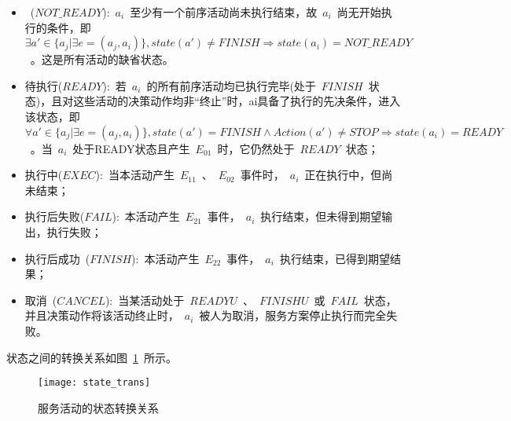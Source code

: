 \begin{itemize}
    
    \item ~($NOT\_READY$):~$a_i$~至少有一个前序活动尚未执行结束，故~$a_i$~尚无开始执行的条件，即~$\exists a' \in \{ {a_j}|\exists e = ( {{a_j},{a_i}} )\} ,state ( {a'} ) \ne FINISH \Rightarrow state ( {{a_i}} ) = NOT\_READY$~。这是所有活动的缺省状态。
    
    \item 待执行($READY$):~若~$a_i$~的所有前序活动均已执行完毕(处于~$FINISH$~状态)，且对这些活动的决策动作均非“终止”时，ai具备了执行的先决条件，进入该状态，即~$\forall a' \in \{ {a_j}|\exists e = ( {{a_j},{a_i}} )\} ,state ( {a'} ) = FINISH \wedge Action(a') \ne STOP \Rightarrow state ( {{a_i}} ) = READY$~。当~$a_i$~处于READY状态且产生~$E_{01}$~时，它仍然处于~$READY$~状态；
    
    \item 执行中($EXEC$):~当本活动产生~$E_{11}$~、~$E_{02}$~事件时，~$a_i$~正在执行中，但尚未结束；
    
    \item 执行后失败($FAIL$):~本活动产生~$E_{21}$~事件，~$a_i$~执行结束，但未得到期望输出，执行失败；
    
    \item 执行后成功~($FINISH$):~本活动产生~$E_{22}$~事件，~$a_i$~执行结束，已得到期望结果；
    
    \item 取消~($CANCEL$):~当某活动处于~$READYU$~、~$FINISHU$~或~$FAIL$~状态，并且决策动作将该活动终止时，~$a_i$~被人为取消，服务方案停止执行而完全失败。
\end{itemize}

状态之间的转换关系如图~\ref{figure:state_trans}~所示。
\begin{figure}[htbp]
    \centering
    \texttt{[image: state\_trans]}
    \caption{服务活动的状态转换关系}\label{figure:state_trans}
    \vspace{-1em}
\end{figure}

